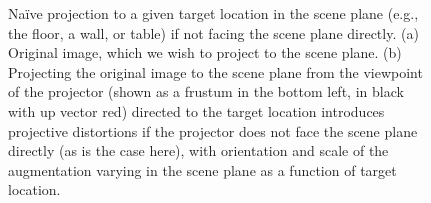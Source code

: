 \documentclass[review]{elsarticle}
\begin{document}
\begin{figure}[t]
    \centering
    \qquad
    \caption{Na\"ive projection to a given target location in the scene plane (e.g., the floor, a wall, or table) if not facing the scene plane directly. (a) Original image, which we wish to project to the scene plane. (b) Projecting the original image to the scene plane from the viewpoint of the projector (shown as a frustum in the bottom left, in black with up vector red) directed to the target location introduces projective distortions if the projector does not face the scene plane directly (as is the case here), with orientation and scale of the augmentation varying in the scene plane as a function of target location.}
    \label{fig:proj}
\end{figure}
\end{document}
